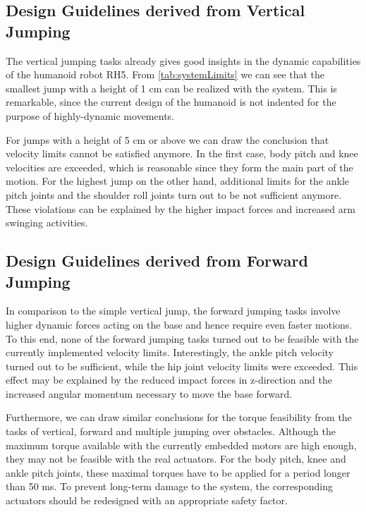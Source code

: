 \subsection{Design Guidelines derived from Vertical Jumping}
The vertical jumping tasks already gives good insights in the dynamic capabilities of the humanoid robot RH5. From \cref{tab:systemLimits} we can see that the smallest jump with a height of 1 cm can be realized with the system. This is remarkable, since the current design of the humanoid is not indented for the purpose of highly-dynamic movements. 

For jumps with a height of 5 cm or above we can draw the conclusion that velocity limits cannot be satisfied anymore. In the first case, body pitch and knee velocities are exceeded, which is reasonable since they form the main part of the motion. For the highest jump on the other hand, additional limits for the ankle pitch joints and the shoulder roll joints turn out to be not sufficient anymore. These violations can be explained by the higher impact forces and increased arm swinging activities. 

\subsection{Design Guidelines derived from Forward Jumping}
In comparison to the simple vertical jump, the forward jumping tasks involve higher dynamic forces acting on the base and hence require even faster motions. To this end, none of the forward jumping tasks turned out to be feasible with the currently implemented velocity limits. Interestingly, the ankle pitch velocity turned out to be sufficient, while the hip joint velocity limits were exceeded. This effect may be explained by the reduced impact forces in z-direction and the increased angular momentum necessary to move the base forward. 

Furthermore, we can draw similar conclusions for the torque feasibility from the tasks of vertical, forward and multiple jumping over obstacles. Although the maximum torque available with the currently embedded motors are high enough, they may not be feasible with the real actuators. For the body pitch, knee and ankle pitch joints, these maximal torques have to be applied for a period longer than 50 ms. To prevent long-term damage to the system, the corresponding actuators should be redesigned with an appropriate safety factor. 
